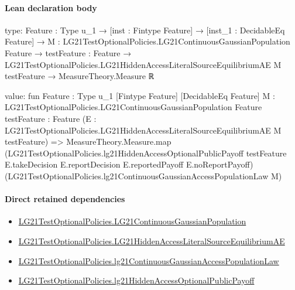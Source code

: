 \documentclass[10pt]{article}
\begin{document}
\paragraph{Lean declaration body}
\begin{ReviewVerbatim}
type:
{Feature : Type u_1} →
  [inst : Fintype Feature] →
    [inst_1 : DecidableEq Feature] →
      {M : LG21TestOptionalPolicies.LG21ContinuousGaussianPopulation Feature} →
        {testFeature : Feature} →
          LG21TestOptionalPolicies.LG21HiddenAccessLiteralSourceEquilibriumAE M testFeature → MeasureTheory.Measure ℝ

value:
fun {Feature : Type u_1} [Fintype Feature] [DecidableEq Feature]
    {M : LG21TestOptionalPolicies.LG21ContinuousGaussianPopulation Feature} {testFeature : Feature}
    (E : LG21TestOptionalPolicies.LG21HiddenAccessLiteralSourceEquilibriumAE M testFeature) =>
  MeasureTheory.Measure.map
    (LG21TestOptionalPolicies.lg21HiddenAccessOptionalPublicPayoff testFeature E.takeDecision E.reportDecision
      E.reportedPayoff E.noReportPayoff)
    (LG21TestOptionalPolicies.lg21ContinuousGaussianAccessPopulationLaw M)
\end{ReviewVerbatim}

\paragraph{Direct retained dependencies}
\begin{itemize}\raggedright
\item \hyperlink{paper-prerequisite-f5e1c886d250142b}{LG21\allowbreak{}Test\allowbreak{}Optional\allowbreak{}Policies.\allowbreak{}LG21\allowbreak{}Continuous\allowbreak{}Gaussian\allowbreak{}Population}
\item \hyperlink{governing-declaration-f111cafc341ec52d}{LG21\allowbreak{}Test\allowbreak{}Optional\allowbreak{}Policies.\allowbreak{}LG21\allowbreak{}Hidden\allowbreak{}Access\allowbreak{}Literal\allowbreak{}Source\allowbreak{}Equilibrium\allowbreak{}AE}
\item \hyperlink{governing-declaration-fa49b6c4b938413f}{LG21\allowbreak{}Test\allowbreak{}Optional\allowbreak{}Policies.\allowbreak{}lg21\allowbreak{}Continuous\allowbreak{}Gaussian\allowbreak{}Access\allowbreak{}Population\allowbreak{}Law}
\item \hyperlink{governing-declaration-b9d86f31a9fb5365}{LG21\allowbreak{}Test\allowbreak{}Optional\allowbreak{}Policies.\allowbreak{}lg21\allowbreak{}Hidden\allowbreak{}Access\allowbreak{}Optional\allowbreak{}Public\allowbreak{}Payoff}
\end{itemize}
\hypertarget{governing-declaration-0b1fec72c01140f1}{}
\end{document}
